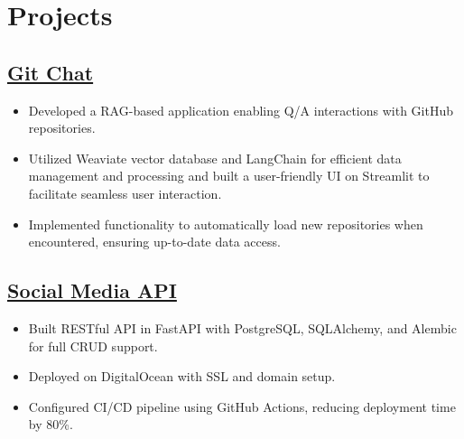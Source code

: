 \documentclass[a4paper,11pt]{article}
\begin{document}
\section*{Projects}
\vspace{-2mm}

\subsection*{\href{https://github.com/kanakOS01/git-chat}{Git Chat}}
\begin{itemize}[left=1pt,itemsep=1pt,topsep=0pt,parsep=0pt]
    \item Developed a RAG-based application enabling Q/A interactions with GitHub repositories.
    \item Utilized Weaviate vector database and LangChain for efficient data management and processing and built a user-friendly UI on Streamlit to facilitate seamless user interaction.
    \item Implemented functionality to automatically load new repositories when encountered, ensuring up-to-date data access.
\end{itemize}

\subsection*{\href{https://github.com/kanakOS01/social-media-fastapi}{Social Media API}}
\begin{itemize}[left=1pt,itemsep=1pt,topsep=0pt,parsep=0pt]
    \item Built RESTful API in FastAPI with PostgreSQL, SQLAlchemy, and Alembic for full CRUD support.
    \item Deployed on DigitalOcean with SSL and domain setup.
    \item Configured CI/CD pipeline using GitHub Actions, reducing deployment time by 80\%.
\end{itemize}

\end{document}
